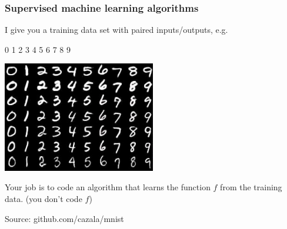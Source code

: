 \documentclass{beamer}
\begin{document}
\begin{frame}
  \frametitle{Supervised machine learning algorithms}

  I give you a training data set with paired inputs/outputs, e.g.

  \begin{center}
    \Huge 0 1 2 3 4 5 6 7 8 9

  \includegraphics[height=1.9in]{mnist-digits}
  \end{center}

  Your job is to code an algorithm that learns the function $f$ from
  the training data. (you don't code $f$)
  
  \scriptsize Source: github.com/cazala/mnist
\end{frame}
\end{document}
